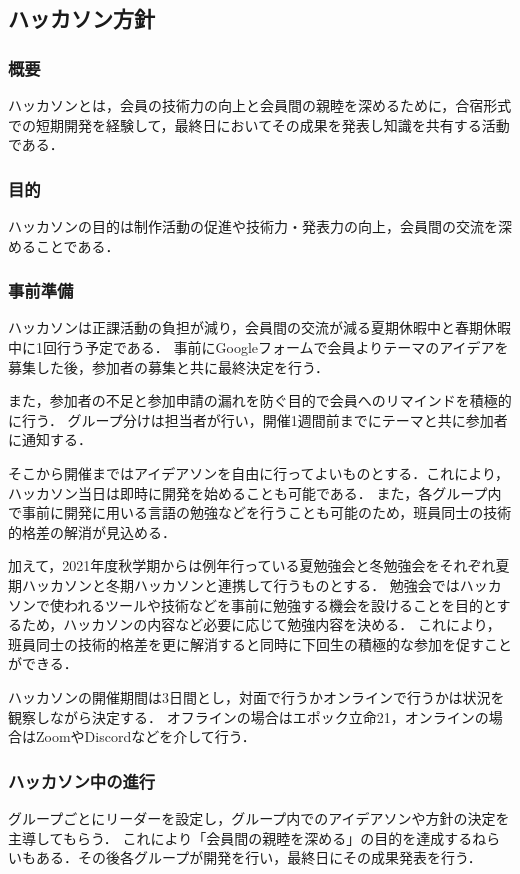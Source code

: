 \subsection*{ハッカソン方針}


\subsubsection*{概要}
ハッカソンとは，会員の技術力の向上と会員間の親睦を深めるために，合宿形式での短期開発を経験して，最終日においてその成果を発表し知識を共有する活動である．

\subsubsection*{目的}
ハッカソンの目的は制作活動の促進や技術力・発表力の向上，会員間の交流を深めることである．

\subsubsection*{事前準備}
ハッカソンは正課活動の負担が減り，会員間の交流が減る夏期休暇中と春期休暇中に1回行う予定である．
事前にGoogleフォームで会員よりテーマのアイデアを募集した後，参加者の募集と共に最終決定を行う．

また，参加者の不足と参加申請の漏れを防ぐ目的で会員へのリマインドを積極的に行う．
グループ分けは担当者が行い，開催1週間前までにテーマと共に参加者に通知する．

そこから開催まではアイデアソンを自由に行ってよいものとする．これにより，ハッカソン当日は即時に開発を始めることも可能である．
また，各グループ内で事前に開発に用いる言語の勉強などを行うことも可能のため，班員同士の技術的格差の解消が見込める．

加えて，2021年度秋学期からは例年行っている夏勉強会と冬勉強会をそれぞれ夏期ハッカソンと冬期ハッカソンと連携して行うものとする．
勉強会ではハッカソンで使われるツールや技術などを事前に勉強する機会を設けることを目的とするため，ハッカソンの内容など必要に応じて勉強内容を決める．
これにより，班員同士の技術的格差を更に解消すると同時に下回生の積極的な参加を促すことができる．


ハッカソンの開催期間は3日間とし，対面で行うかオンラインで行うかは状況を観察しながら決定する．
オフラインの場合はエポック立命21，オンラインの場合はZoomやDiscordなどを介して行う．

\subsubsection*{ハッカソン中の進行}
グループごとにリーダーを設定し，グループ内でのアイデアソンや方針の決定を主導してもらう．
これにより「会員間の親睦を深める」の目的を達成するねらいもある．その後各グループが開発を行い，最終日にその成果発表を行う．

